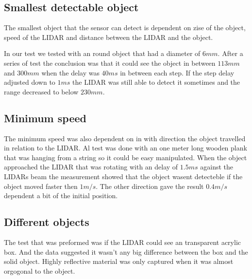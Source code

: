 \subsection{Smallest detectable object}\label{subsection:mesurment-smalest}
The smallest object that the sensor can detect is dependent on zise of the object, speed of the LIDAR and distance between the LIDAR and the object.

In our test we tested with an round object that had a diameter of $6mm$. 
After a series of test the conclusion was that it could see the object in between $113mm$ and $300mm$ when the delay was $40ms$ in between each step.
If the step delay adjusted down to $1ms$ the LIDAR was still able to detect it sometimes and the range decreased to below $230mm$.


\subsection{Minimum speed}\label{subsetion:mesurmen-miniSpeed}
The minimum speed was also dependent on in with direction the object travelled in relation to the LIDAR. 
Al test was done with an one meter long wooden plank that was hanging from a string so it could be easy manipulated.
When the object approached the LIDAR that was rotating with an delay of $1.5ms$ against the LIDARs beam the measurement showed that the object wasent detecteble if the object moved faster then $1m/s$. 
The other direction gave the result $0.4m/s$ dependent a bit of the initial position.

\subsection{Different objects}\label{subsection:mesurment-difObj}
The test that was preformed was if the LIDAR could see an transparent acrylic box.
And the data suggested it wasn't any big difference between the box and the solid object. 
Highly reflective material was only captured when it was almost orgogonal to the object.